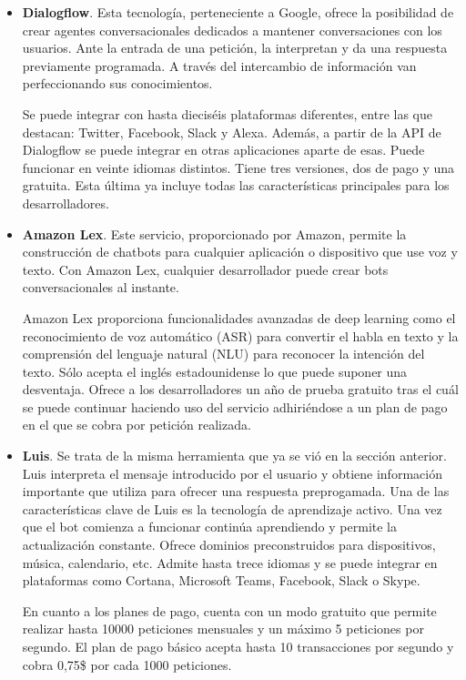 \begin{itemize}
    \item \textbf{Dialogflow}. Esta tecnología, perteneciente a Google, ofrece la posibilidad de crear agentes conversacionales dedicados a mantener conversaciones con los usuarios. Ante la entrada de una petición, la interpretan y da una respuesta previamente programada. A través del intercambio de información van perfeccionando sus conocimientos.
    
    Se puede integrar con hasta dieciséis plataformas diferentes, entre las que destacan: Twitter, Facebook, Slack y Alexa. Además, a partir de la API de Dialogflow se puede integrar en otras aplicaciones aparte de esas. Puede funcionar en veinte idiomas distintos. Tiene tres versiones, dos de pago y una gratuita. Esta última ya incluye todas las características principales para los desarrolladores.

    \item \textbf{Amazon Lex}. Este servicio, proporcionado por Amazon, permite la construcción de chatbots para cualquier aplicación o dispositivo que use voz y texto. Con Amazon Lex, cualquier desarrollador puede crear bots conversacionales al instante.
    
    Amazon Lex proporciona funcionalidades avanzadas de deep learning como el reconocimiento de voz automático (ASR) para convertir el habla en texto y la comprensión del lenguaje natural (NLU) para reconocer la intención del texto. Sólo acepta el inglés estadounidense lo que puede suponer una desventaja. Ofrece a los desarrolladores un año de prueba gratuito tras el cuál se puede continuar haciendo uso del servicio adhiriéndose a un plan de pago en el que se cobra por petición realizada.
    
    \item \textbf{Luis}. Se trata de la misma herramienta que ya se vió en la sección anterior. Luis interpreta el mensaje introducido por el usuario y obtiene información importante que utiliza para ofrecer una respuesta preprogamada. Una de las características clave de Luis es la tecnología de aprendizaje activo. Una vez que el bot comienza a funcionar continúa aprendiendo y permite la actualización constante. Ofrece dominios preconstruidos para dispositivos, música, calendario, etc. Admite hasta trece idiomas y se puede integrar en plataformas como Cortana, Microsoft Teams, Facebook, Slack o Skype. 
    
    En cuanto a los planes de pago, cuenta con un modo gratuito que permite realizar hasta 10000 peticiones mensuales y un máximo 5 peticiones por segundo. El plan de pago básico acepta hasta 10 transacciones por segundo y cobra 0,75\$ por cada 1000 peticiones.
    

\end{itemize}

